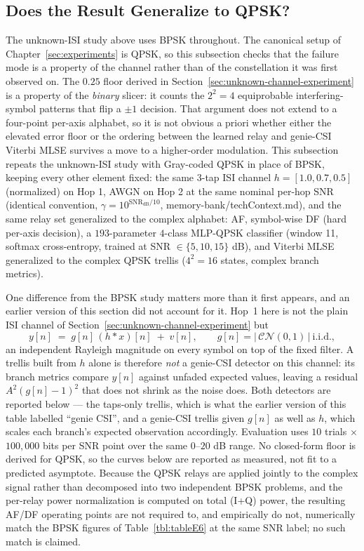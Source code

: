 \subsection{Does the Result Generalize to QPSK?}\label{sec:qpsk-unknown-channel}

The unknown-ISI study above uses BPSK throughout. The canonical setup of Chapter~\ref{sec:experiments} is QPSK, so this subsection checks that the failure mode is a property of the channel rather than of the constellation it was first observed on. The $0.25$ floor derived in Section~\ref{sec:unknown-channel-experiment} is a property of the \emph{binary} slicer: it counts the $2^{2}=4$ equiprobable interfering-symbol patterns that flip a $\pm1$ decision. That argument does not extend to a four-point per-axis alphabet, so it is not obvious a priori whether either the elevated error floor or the ordering between the learned relay and genie-CSI Viterbi MLSE survives a move to a higher-order modulation. This subsection repeats the unknown-ISI study with Gray-coded QPSK in place of BPSK, keeping every other element fixed: the same $3$-tap ISI channel $h=[1.0,0.7,0.5]$ (normalized) on Hop 1, AWGN on Hop 2 at the same nominal per-hop SNR (identical convention, $\gamma=10^{\text{SNR}_{\text{dB}}/10}$, memory-bank/techContext.md), and the same relay set generalized to the complex alphabet: AF, symbol-wise DF (hard per-axis decision), a $193$-parameter $4$-class MLP-QPSK classifier (window 11, softmax cross-entropy, trained at SNR $\in\{5,10,15\}$ dB), and Viterbi MLSE generalized to the complex QPSK trellis ($4^{2}=16$ states, complex branch metrics).

One difference from the BPSK study matters more than it first appears, and an earlier version of this section did not account for it. Hop~1 here is not the plain ISI channel of Section~\ref{sec:unknown-channel-experiment} but
\begin{equation}\label{eq:qpsk-hop1}
y[n] \;=\; g[n]\,(h * x)[n] \;+\; v[n], \qquad g[n] = |\,\mathcal{CN}(0,1)\,|\ \text{i.i.d.},
\end{equation}
an independent Rayleigh magnitude on every symbol on top of the fixed filter. A trellis built from $h$ alone is therefore \emph{not} a genie-CSI detector on this channel: its branch metrics compare $y[n]$ against unfaded expected values, leaving a residual $A^{2}(g[n]-1)^{2}$ that does not shrink as the noise does. Both detectors are reported below --- the taps-only trellis, which is what the earlier version of this table labelled ``genie CSI'', and a genie-CSI trellis given $g[n]$ as well as $h$, which scales each branch's expected observation accordingly. Evaluation uses $10$ trials $\times$ $100{,}000$ bits per SNR point over the same $0$--$20$ dB range. No closed-form floor is derived for QPSK, so the curves below are reported as measured, not fit to a predicted asymptote. Because the QPSK relays are applied jointly to the complex signal rather than decomposed into two independent BPSK problems, and the per-relay power normalization is computed on total (I+Q) power, the resulting AF/DF operating points are not required to, and empirically do not, numerically match the BPSK figures of Table~\ref{tbl:tableE6} at the same SNR label; no such match is claimed.

